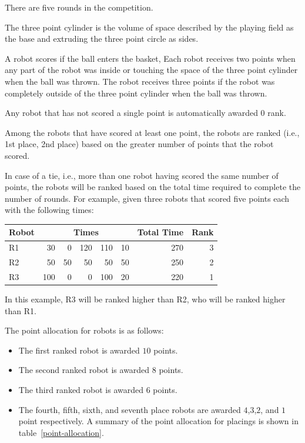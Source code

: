 \documentclass[12pt]{hurocup}
\begin{document}
\begin{lawlist}[BB]

\item There are five rounds in the competition.

\item The three point cylinder is the volume of space described by the
 playing field as the base and extruding the three point circle
 as sides. 

\item A robot scores if the ball enters the basket, Each robot
 receives two points when any part of the robot was inside or touching
 the space of the three point cylinder when the ball was thrown. The
 robot receives three points if the robot was completely outside of
 the three point cylinder when the ball was thrown.

\item Any robot that has not scored a single point is automatically
  awarded 0 rank.

\item Among the robots that have scored at least one point, the robots
  are ranked (i.e., 1st place, 2nd place) based on the greater number
  of points that the robot scored.

\item In case of a tie, i.e., more than one robot having scored the
  same number of points, the robots will be ranked based on the total
  time required to complete the number of rounds. For example, given
  three robots that scored five points each with the following times:

      \begin{center}
        \begin{tabular}{l|rrrrr|r|r|}
          \hline
          Robot & \multicolumn{5}{c}{Times} & Total Time & Rank \\
          \hline
          R1 & 30 & 0 & 120 & 110 & 10 & 270 & 3 \\
          R2 & 50 & 50 & 50 & 50 & 50 & 250 & 2 \\
          R3 & 100 & 0 & 0 & 100 & 20 & 220 & 1 \\
          \hline
        \end{tabular}
      \end{center}

  In this example, R3 will be ranked higher than R2, who will be
  ranked higher than R1.

\item The point allocation for robots is as follows:
  \begin{itemize}
  \item The first ranked robot is awarded $10$ points.
  \item The second ranked robot is awarded $8$ points.
  \item The third ranked robot is awarded $6$ points.
  \item The fourth, fifth, sixth, and seventh place robots are awarded
    $4$,$3$,$2$, and $1$ point respectively.  A summary of the point
    allocation for placings is shown in table~\ref{point-allocation}.


\end{itemize}
\end{lawlist}
\end{document}
